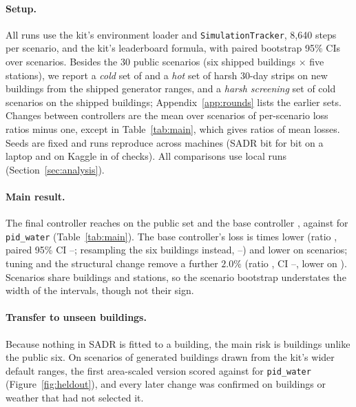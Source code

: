 \documentclass{article}
\begin{document}
\paragraph{Setup.} All runs use the kit's environment loader and \texttt{SimulationTracker}, 8,640 steps per scenario, and the kit's leaderboard formula, with paired bootstrap 95\% CIs over scenarios. Besides the 30 public scenarios (six shipped buildings $\times$ five stations), we report a \emph{cold} set of \RTenConfHarshCThreeN{} and a \emph{hot} set of \RTenConfHotHN{} harsh 30-day strips on \RTenNNewBuild{} new buildings from the shipped generator ranges, and a \emph{harsh screening} set of \RSixHarshSN{} cold scenarios on the shipped buildings; Appendix~\ref{app:rounds} lists the earlier sets. Changes between controllers are the mean over scenarios of per-scenario loss ratios minus one, except in Table~\ref{tab:main}, which gives ratios of mean losses. Seeds are fixed and runs reproduce across machines (SADR bit for bit on a laptop and on Kaggle in \RSixReproIdentical{} of \RSixReproN{} checks). All comparisons use local runs (Section~\ref{sec:analysis}).



\paragraph{Main result.} The final controller reaches \FinPub{} on the public set and the base controller \RTenConfPubCand, against \MetricPidWater{} for \texttt{pid\_water} (Table~\ref{tab:main}). The base controller's loss is \RElvPwTimes{} times lower (ratio \RElvPwRatio, paired 95\% CI \RElvPwRatioLo--\RElvPwRatioHi; resampling the six buildings instead, \RElvPwRatioCLo--\RElvPwRatioCHi) and lower on \RElvPwWins{} scenarios; tuning and the structural change remove a further \(2.0\%\) (ratio \FinPubRatio, CI \FinPubRatioLo--\FinPubRatioHi, lower on \FinPubWins). Scenarios share buildings and stations, so the scenario bootstrap understates the width of the intervals, though not their sign.

\paragraph{Transfer to unseen buildings.} Because nothing in SADR is fitted to a building, the main risk is buildings unlike the public six. On \NHeldAll{} scenarios of \NHeldAllBuild{} generated buildings drawn from the kit's wider default ranges, the first area-scaled version scored \HeldAllMetricOurs{} against \HeldAllMetricPidWater{} for \texttt{pid\_water} (Figure~\ref{fig:heldout}), and every later change was confirmed on buildings or weather that had not selected it.
\end{document}
